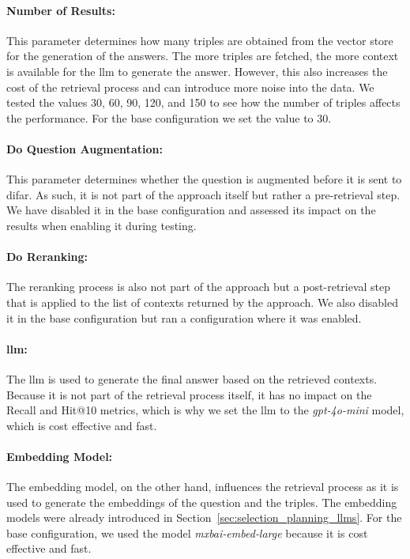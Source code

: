 \paragraph{Number of Results:} This parameter determines how many triples are obtained from the vector store for the generation of the answers. The more triples are fetched, the more context is available for the \gls{llm} to generate the answer. However, this also increases the cost of the retrieval process and can introduce more noise into the data. We tested the values 30, 60, 90, 120, and 150 to see how the number of triples affects the performance. For the base configuration we set the value to 30.

\paragraph{Do Question Augmentation:} This parameter determines whether the question is augmented before it is sent to \gls{difar}. As such, it is not part of the approach itself but rather a pre-retrieval step. We have disabled it in the base configuration and assessed its impact on the results when enabling it during testing.

\paragraph{Do Reranking:} The reranking process is also not part of the approach but a post-retrieval step that is applied to the list of contexts returned by the approach. We also disabled it in the base configuration but ran a configuration where it was enabled.

\paragraph{\gls{llm}:} The \gls{llm} is used to generate the final answer based on the retrieved contexts. Because it is not part of the retrieval process itself, it has no impact on the Recall and Hit@10 metrics, which is why we set the \gls{llm} to the \emph{gpt-4o-mini} model, which is cost effective and fast. 

\paragraph{Embedding Model:} The embedding model, on the other hand, influences the retrieval process as it is used to generate the embeddings of the question and the triples. The embedding models were already introduced in Section~\ref{sec:selection_planning_llms}. For the base configuration, we used the model \emph{mxbai‑embed‑large} because it is cost effective and fast.

